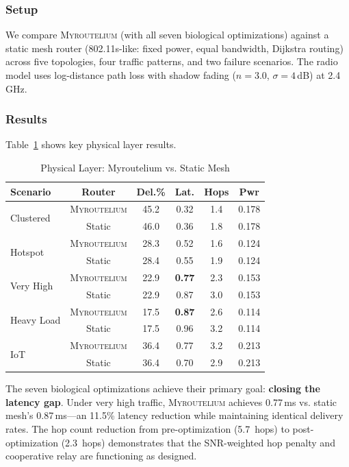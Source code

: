 \documentclass[conference,10pt]{IEEEtran}
\newcommand{\myc}{\textsc{Myroutelium}}
\begin{document}
\subsubsection{Setup}

We compare \myc{} (with all seven biological optimizations) against a static mesh router (802.11s-like: fixed power, equal bandwidth, Dijkstra routing) across five topologies, four traffic patterns, and two failure scenarios. The radio model uses log-distance path loss with shadow fading ($n=3.0$, $\sigma=4$\,dB) at 2.4\,GHz.

\subsubsection{Results}

Table~\ref{tab:radio} shows key physical layer results.

\begin{table}[t]
\centering
\caption{Physical Layer: Myroutelium vs. Static Mesh}
\label{tab:radio}
\small
\begin{tabular}{lccccc}
\toprule
\textbf{Scenario} & \textbf{Router} & \textbf{Del.\%} & \textbf{Lat.} & \textbf{Hops} & \textbf{Pwr} \\
\midrule
\multirow{2}{*}{Clustered} & \myc{} & 45.2 & 0.32 & 1.4 & 0.178 \\
 & Static & 46.0 & 0.36 & 1.8 & 0.178 \\
\midrule
\multirow{2}{*}{Hotspot} & \myc{} & 28.3 & 0.52 & 1.6 & 0.124 \\
 & Static & 28.4 & 0.55 & 1.9 & 0.124 \\
\midrule
\multirow{2}{*}{Very High} & \myc{} & 22.9 & \textbf{0.77} & 2.3 & 0.153 \\
 & Static & 22.9 & 0.87 & 3.0 & 0.153 \\
\midrule
\multirow{2}{*}{Heavy Load} & \myc{} & 17.5 & \textbf{0.87} & 2.6 & 0.114 \\
 & Static & 17.5 & 0.96 & 3.2 & 0.114 \\
\midrule
\multirow{2}{*}{IoT} & \myc{} & 36.4 & 0.77 & 3.2 & 0.213 \\
 & Static & 36.4 & 0.70 & 2.9 & 0.213 \\
\bottomrule
\end{tabular}
\end{table}

The seven biological optimizations achieve their primary goal: \textbf{closing the latency gap}. Under very high traffic, \myc{} achieves 0.77\,ms vs. static mesh's 0.87\,ms---an 11.5\% latency reduction while maintaining identical delivery rates. The hop count reduction from pre-optimization (5.7~hops) to post-optimization (2.3~hops) demonstrates that the SNR-weighted hop penalty and cooperative relay are functioning as designed.
\end{document}
